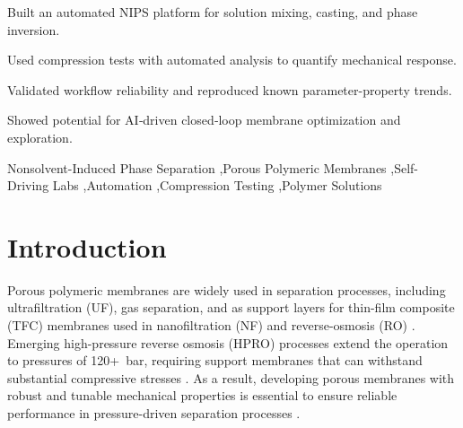 \documentclass[preprint,12pt,times]{elsarticle}
\begin{document}
\begin{frontmatter}
\begin{highlights}
\item Built an automated NIPS platform for solution mixing, casting, and phase inversion.
\item Used compression tests with automated analysis to quantify mechanical response.
\item Validated workflow reliability and reproduced known parameter-property trends.
\item Showed potential for AI‑driven closed‑loop membrane optimization and exploration.
\end{highlights}

\begin{keyword}


Nonsolvent-Induced Phase Separation \sep Porous Polymeric Membranes \sep Self-Driving Labs \sep Automation \sep Compression Testing \sep Polymer Solutions
\end{keyword}

\end{frontmatter}

\twocolumn
\section{Introduction}
\label{sec1}
Porous polymeric membranes are widely used in separation processes, including ultrafiltration (UF), gas separation, and as support layers for thin-film composite (TFC) membranes used in nanofiltration (NF) and reverse-osmosis (RO) \cite{WARSINGER2018209,Park2017, C9RA07114H}. Emerging high-pressure reverse osmosis (HPRO) processes extend the operation to pressures of 120+~bar, requiring support membranes that can withstand substantial compressive stresses \cite{Davenport2018}. As a result, developing porous membranes with robust and tunable mechanical properties is essential to ensure reliable performance in pressure-driven separation processes \cite{Davenport2018}. 
\end{document}
